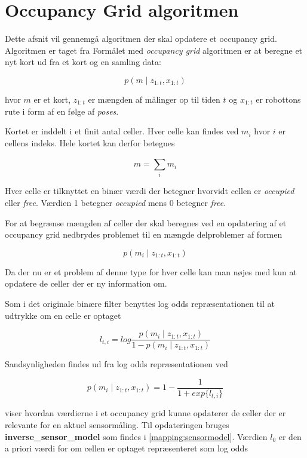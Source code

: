 \section{Occupancy Grid algoritmen}
Dette afsnit vil gennemgå algoritmen der skal opdatere et occupancy grid.
Algoritmen er taget fra \cite[p.~xxx]{probabilisticRobotics}
Formålet med \textit{occupancy grid} algoritmen er at beregne	et nyt kort ud fra et kort og en samling data:

\[ p(m \mid z_{1:t}, x_{1:t}) \]

hvor $m$ er et kort, $ z_{1:t} $ er mængden af målinger op til tiden $t$ og $ x_{1:t} $ er robottons rute i form af en følge af \textit{poses}.

Kortet er inddelt i et finit antal celler.
Hver celle kan findes ved $ m_i $ hvor $i$ er cellens indeks. 
Hele kortet kan derfor betegnes

\[  m = \sum_{i}^{} m_i \]

Hver celle er tilknyttet en binær værdi der betegner hvorvidt cellen er \textit{occupied} eller \textit{free}.
Værdien 1 betegner \textit{occupied} mens 0 betegner \textit{free}.

For at begrænse mængden af celler der skal beregnes ved en opdatering af et occupancy grid nedbrydes problemet til en mængde delproblemer af formen

\[ p(m_i \mid z_{1:t}, x_{1:t}) \]

Da der nu er et problem af denne type for hver celle kan man nøjes med kun at opdatere de celler der er ny information om.

Som i det originale binære filter  benyttes log odds repræsentationen til at udtrykke om en celle er optaget

\[ l_{t,i} = log{ \frac{p(m_i \mid z_{1:t}, x_{1:t})}{1 - p(m_i \mid z_{1:t}, x_{1:t})}} \]

Sandsynligheden findes ud fra log odds repræsentationen ved

\[ p(m_i \mid z_{1:t}, x_{1:t}) = 1 - \frac{1}{1 + exp \{ l_{t,i} \} } \]

 viser hvordan værdierne i et occupancy grid kunne opdaterer de celler der er relevante for en aktuel sensormåling. 
Til opdateringen bruges \textbf{inverse\_sensor\_model} som findes i \cref{mapping:sensormodel}. 
Værdien $ l_0 $ er den a priori værdi for om cellen er optaget repræsenteret som log odds

